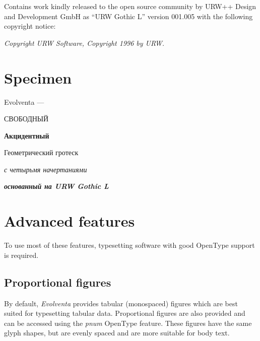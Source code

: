 \documentclass[a4paper,12pt,oneside,extrafontsizes]{memoir}
\begin{document}
Contains work kindly released to the open source community by URW++ Design and Development GmbH as ``URW Gothic L'' version 001.005 with the following copyright notice:

\vspace{0.5\onelineskip}

{\itshape Copyright URW Software, Copyright 1996 by URW.}

\chapter{Specimen}

\vspace{-\onelineskip}

{\Huge\hspace{0.5em} Evolventa ---\par}
{\HUGE СВОБОДНЫЙ\par}
{\Huge\bfseries\hspace{1.5em} Акцидентный\par}
{\huge Геометрический гротеск\par}
{\LARGE\itshape\hspace{2em} с четырьмя начертаниями\par}
{\Large\bfseries\itshape\hspace{1em} основанный на URW Gothic L\par}

\vspace*{2\onelineskip}


\chapter{Advanced features}

To use most of these features, typesetting software with good OpenType support is required.

\section{Proportional figures}

By default, \emph{Evolventa} provides tabular (monospaced) figures which are best suited for typesetting tabular data. Proportional figures are also provided and can be accessed using the \emph{pnum} OpenType feature. These figures have the same glyph shapes, but are evenly spaced and are more suitable for body text.
\end{document}
